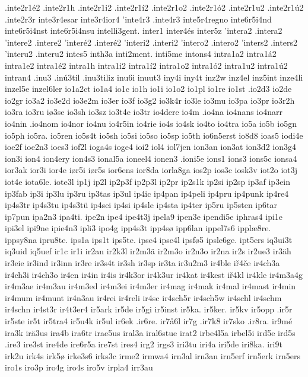 {{.inte2r1é2
.inte2r1h
.inte2r1i2
.inte2r1í2
.inte2r1o2
.inte2r1ó2
.inte2r1u2
.inte2r1ú2
.inte2r3r
inte3r4esar
inte3r4ior4
'inte4r3
.inte4r3
inte5r4regno
inte6r5i4nd
inte6r5i4nst
inte6r5i4nsu
intelli3gent.
inter1
inter4és
inter5z
'intera2
.intera2
'intere2
.intere2
'interé2
.interé2
'interi2
.interi2
'intero2
.intero2
'inters2
.inters2
'interu2
.interu2
intes5
inth3a
inti2ment.
inti5me
intons4
intra1a2
intra1á2
intra1e2
intra1é2
intra1h
intra1i2
intra1í2
intra1o2
intra1ó2
intra1u2
intra1ú2
intran4
.inu3
.inú3til
.inu3tiliz
inu6i
inuut3
iny4i
iny4t
inz2w
inz4el
inz5int
inze4li
inzel5e
inzel6ler
io1a2ct
io1a4
io1c
io1h
io1i
io1o2
io1pl
io1re
io1st
.io2d3
io2de
io2gr
io3a2
io3e2d
io3e2m
io3er
io3f
io3g2
io3k4r
io3le
io3mu
io3pa
io3pr
io3r2h
io3ra
io3ru
iø3se
io3sh
io3sz
io3t4e
io3tr
io4dere
io4m
.io4na
io4nans
io4narr
io4nin
.io4nom
io4nor
io4nu
io4r5in
io4rie
io4s
io4sk
io4to
io4tra
io5a
io5b
io5gn
io5ph
io5ra.
io5ren
io5s4t
io5sh
io5si
io5so
io5sp
io5th
io6n5erst
io8d8
ioas5
iodi4e
ioe2f
ioe2n3
ioes3
iof2l
ioga4s
ioge4
ioi2
iol4
iol7jen
ion3an
ion3at
ion3d2
ion3g4
ion3i
ion4
ion4ery
ion4s3
ional5a
ioneel4
ionen3
.ioni5e
ions1
ions3
ions5c
ionsa4
ior3ak
ior3i
ior4e
iør5i
iør5s
ior6ens
ior8da
iorla8ga
ios2p
ios3c
iosk3v
iot2o
iot3j
iot4e
iota6le.
iote3l
ip1j
ip2l
ip2p3f
ip2p3l
ip2pr
ip2s1k
ip2si
ip2sp
ip3af
ip3ein
ip3fab
ip3i
ip3lu
ip3ru
ip3tas
ip3ul
ip4ic
ip4pan
ip4peli
ip4pru
ip4punk
ip4re4
ip4s3tr
ip4s3tu
ip4s3tü
ip4sei
ip4si
ip4sle
ip4sta
ip4ter
ip5ru
ip5sten
ip6tar
ip7pun
ipa2n3
ipa4ti.
ipe2n
ipe4
ipe4t3j
ipela9
ipen3e
ipendi5e
iphras4
ipi1e
ipi3el
ipi9ne
ipie4n3
ipli3
ipo4g
ipp4s3t
ipp4sø
ipp6lan
ippel7s6
ipplæ8re.
ippsy8na
ipru8te.
ips1a
ips1t
ips5te.
ipse4
ipse4l
ipsfø5
ipsle6ge.
ipt5ers
iq3ui3t
iq3uid
iq5uef
ir1c
ir1i
ir2an
ir2k3l
ir2m3ä
ir2m3o
ir2n3o
ir2na
ir2s
ir2ue3
ir3äh
ir3eie
ir3ind
ir3inn
ir3re
ir3s4t
ir3sh
ir3sp
ir3ta
ir3u2m3
ir4ble
iř4če
ir4ch3a
ir4ch3i
ir4ch3o
ir4en
ir4in
ir4is
ir4k3or
ir4k3ur
ir4kat
ir4kest
iř4kl
ir4kle
ir4m3a4g
ir4m3ae
ir4m3au
ir4m3ed
ir4m3ei
ir4m3er
ir4mag
ir4mak
ir4mal
ir4mast
ir4min
ir4mum
ir4munt
ir4n3au
ir4rei
ir4reli
ir4sc
ir4sch5r
ir4sch5w
ir4schl
ir4schm
ir4schn
ir4st3r
ir4t3er4
ir5ark
ir5de
ir5gi
ir5inst
ir5ka.
ir5ker.
ir5kv
ir5opp
.ir5r
ir5ste
ir5t
ir5tra4
ir5u4k
ir5ul
ir6ek
.ir6re.
ir7å6l
ir7g
.ir7k8
ir7sko
.ir8ra.
ir9mé
ira3k
irä3us
ira4b
ira6tr
irae5us
iral3a
iral6stue
irat2
irbe4l5a
irbel5i
ird5e
ird5s
.ire3
ire3st
ire4de
ire6r5a
ire7st
ires4
irg2
irgs3
iri3tu
iri4a
iri5de
iri8ka.
iri9t
irk2u
irk4s
irk5ø
irke3s6
irks3c
irme2
irmwa4
irn3al
irn3an
irn5erf
irn5erk
irn5ers
iro1s
iro3p
iro4g
iro4s
iro5v
irpla4
irr3au
}}
